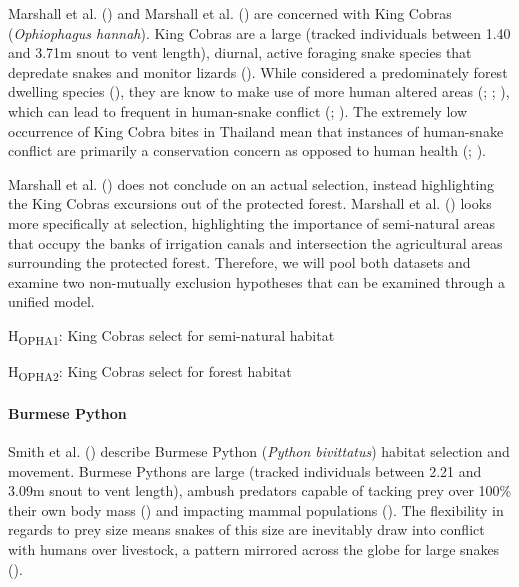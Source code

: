 \documentclass[10pt,a4paper]{article}
\begin{document}
Marshall et al. () and Marshall et al. () are concerned with King Cobras (\emph{Ophiophagus hannah}).
King Cobras are a large (tracked individuals between 1.40 and 3.71m snout to vent length), diurnal, active foraging snake species that depredate snakes and monitor lizards ().
While considered a predominately forest dwelling species (), they are know to make use of more human altered areas (; ; ), which can lead to frequent in human-snake conflict (; ).
The extremely low occurrence of King Cobra bites in Thailand mean that instances of human-snake conflict are primarily a conservation concern as opposed to human health (; ).

Marshall et al. () does not conclude on an actual selection, instead highlighting the King Cobras excursions out of the protected forest.
Marshall et al. () looks more specifically at selection, highlighting the importance of semi-natural areas that occupy the banks of irrigation canals and intersection the agricultural areas surrounding the protected forest.
Therefore, we will pool both datasets and examine two non-mutually exclusion hypotheses that can be examined through a unified model.

H\textsubscript{OPHA1}: King Cobras select for semi-natural habitat

H\textsubscript{OPHA2}: King Cobras select for forest habitat

\paragraph{Burmese Python}\label{burmese-python}

Smith et al. () describe Burmese Python (\emph{Python bivittatus}) habitat selection and movement.
Burmese Pythons are large (tracked individuals between 2.21 and 3.09m snout to vent length), ambush predators capable of tacking prey over 100\% their own body mass () and impacting mammal populations ().
The flexibility in regards to prey size means snakes of this size are inevitably draw into conflict with humans over livestock, a pattern mirrored across the globe for large snakes ().
\end{document}
